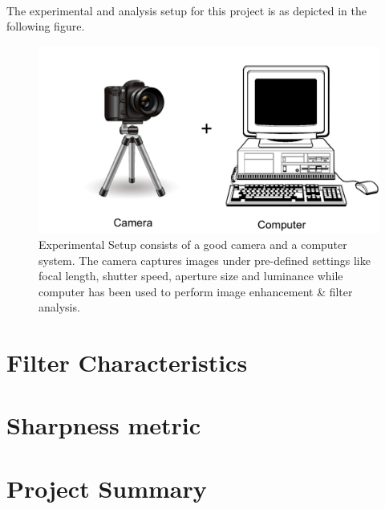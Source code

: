 \documentclass{report}
\begin{document}
\\
The experimental and analysis setup for this project is as depicted in the following figure.
\begin{figure}[h!]
  \centering
                \centering
                \includegraphics[width=.5\textwidth]{experimental_setup.png}
                \caption{Experimental Setup consists of a good camera and a computer system. The camera captures images under pre-defined settings like focal length, shutter speed, aperture size and luminance while computer has been used to perform image enhancement \& filter analysis.}
                \end{figure}


\chapter{Filter Characteristics}
\chapter{Sharpness metric}
\chapter{Project Summary}

%                
%                
\end{document}
